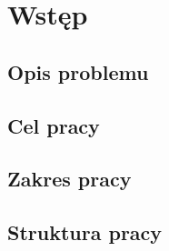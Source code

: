 
\chapter*{Wstęp}\label{ch:admission}

\section*{Opis problemu}\label{sec:admission:problem-description}
\todo{}

\section*{Cel pracy}\label{sec:admission:thesis-goal}

\todo{}

\section*{Zakres pracy}\label{sec:admission:scope-of-work}

\todo{}

\section*{Struktura pracy}\label{sec:admission:thesis-structure}

\todo{}

\thispagestyle{normal}
